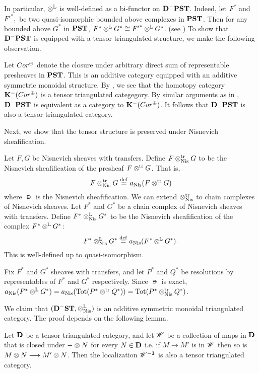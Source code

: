 In particular, $\tL$ is well-defined as a bi-functor on 
$\DCat[D]^-\PST$. Indeed, let $F^*$ and ${F'}^*,$ be two 
quasi-isomorphic bounded above complexes in $\PST$. Then for any 
bounded above $G^*$ in $\PST$, $F^* \tL G^* \cong {F'}^* \tL G^*$. 
(see \cite[Lemma 8.7]{MVW}) To show that $\DCat^-\PST$ is equipped
with a tensor triangulated structure, we make the following 
observation.

Let $\Cor^{\oplus}$ denote the closure under arbitrary direct 
sum of representable presheaves in $\PST$. This is an additive
category equipped with an additive symmetric monoidal structure.
By \cite[Prop. 8A.4]{MVW}, we see that the homotopy category 
$\DCat[K]^-(\Cor^{\oplus})$ is a tensor triangulated categegory.
By similar arguments as in \cite[10.4.8]{WH}, $\DCat[D]^-\PST$
is equivalent as a category to $\DCat[K]^-(\Cor^{\oplus})$.
It follows that $\DCat[D]^-\PST$ is also a tensor triangulated 
category.

Next, we show that the tensor structure is preserved under
Nisnevich sheafification.

\begin{defn}\label{def_shcor_tensor}
Let $F, G$ be Nisnevich sheaves with transfers. Define
$F \ttrNis G$ to be the Nisnevich sheafification of the presheaf
$F \ttr G$. That is,
\[
F \ttrNis G \defeq \nis(F \ttr G)
\]
where $\nis$ is the Nisnevich sheafification. We can extend 
$\ttrNis$ to chain complexes of Nisnevich sheaves. Let $F^*$ and 
$G^*$ be a chain complex of Nisnevich sheaves with transfers. 
Define $F^* \tLNis G^*$ to be the Nisnevich sheafification of the 
complex $F^* \tL G^*$:
\[
F^* \tLNis G^* \defeq \nis(F^* \tL G^*).
\]
This is well-defined up to quasi-isomorphism.
\end{defn}

\begin{rmk}
Fix $F^*$ and $G^*$ sheaves with transfers, and let $P^*$ and 
$Q^*$ be resolutions by representables of $F^*$ and $G^*$ 
respectively. Since $\nis$ is exact, $\nis(F^* \tL G^*) = 
\nis(\Tot(P^* \ttr Q^*)) = \Tot(P^* \ttrNis Q^*)$.
\end{rmk}

We claim that $(\DShCor, \tLNis)$ is an additive symmetric 
monoidal triangulated category. The proof depends on the following
lemma.

\begin{lem}\label{lem_loc_and_tensor}
Let $\DCat$ be a tensor triangulated category, and let $\Cat{W}$
be a collection of maps in $\DCat$ that is closed under $-\tensor 
N$ for every $N \in \DCat$ i.e. if $M \to M'$ is in $\Cat{W}$ then 
so is $M \tensor N \to M' \tensor N$. Then the localization $\DCat 
[\Cat{W}^{-1}]$ is also a tensor triangulated category.
\end{lem}

